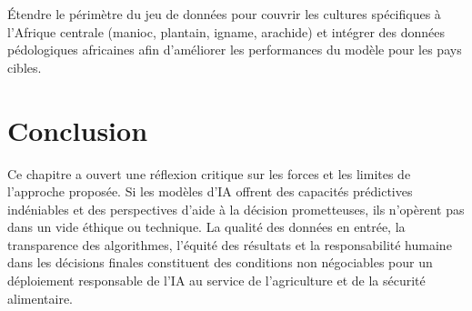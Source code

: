 Étendre le périmètre du jeu de données pour couvrir les cultures spécifiques à l'Afrique centrale (manioc, plantain, igname, arachide) et intégrer des données pédologiques africaines afin d'améliorer les performances du modèle pour les pays cibles.

\section{Conclusion}

Ce chapitre a ouvert une réflexion critique sur les forces et les limites de l'approche proposée. Si les modèles d'IA offrent des capacités prédictives indéniables et des perspectives d'aide à la décision prometteuses, ils n'opèrent pas dans un vide éthique ou technique. La qualité des données en entrée, la transparence des algorithmes, l'équité des résultats et la responsabilité humaine dans les décisions finales constituent des conditions non négociables pour un déploiement responsable de l'IA au service de l'agriculture et de la sécurité alimentaire.

\newpage

